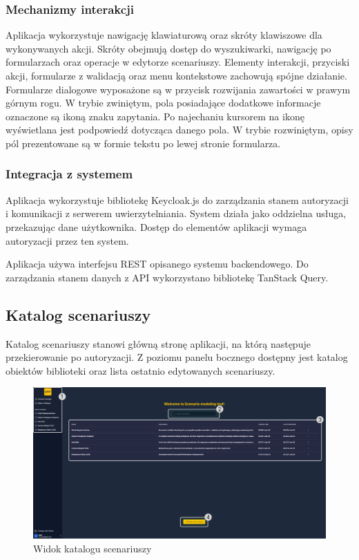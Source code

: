 \subsubsection{Mechanizmy interakcji}
Aplikacja wykorzystuje nawigację klawiaturową oraz skróty klawiszowe dla wykonywanych akcji. Skróty obejmują dostęp do wyszukiwarki, nawigację po formularzach oraz operacje w edytorze scenariuszy. Elementy interakcji, przyciski akcji, formularze z walidacją oraz menu kontekstowe zachowują spójne działanie.
Formularze dialogowe wyposażone są w przycisk rozwijania zawartości w prawym górnym rogu. W trybie zwiniętym, pola posiadające dodatkowe informacje oznaczone są ikoną znaku zapytania. Po najechaniu kursorem na ikonę wyświetlana jest podpowiedź dotycząca danego pola. W trybie rozwiniętym, opisy pól prezentowane są w formie tekstu po lewej stronie formularza.

\subsubsection{Integracja z systemem}
Aplikacja wykorzystuje bibliotekę Keycloak.js do zarządzania stanem autoryzacji i komunikacji z serwerem uwierzytelniania. System działa jako oddzielna usługa, przekazując dane użytkownika. Dostęp do elementów aplikacji wymaga autoryzacji przez ten system.


Aplikacja używa interfejsu REST opisanego systemu backendowego. Do zarządzania stanem danych z API wykorzystano bibliotekę TanStack Query.

\subsection{Katalog scenariuszy}

Katalog scenariuszy stanowi główną stronę aplikacji, na którą następuje przekierowanie po autoryzacji. Z poziomu panelu bocznego dostępny jest katalog obiektów biblioteki oraz lista ostatnio edytowanych scenariuszy.

\begin{figure}[h]
    \centering
    \includegraphics[width=\textwidth]{resources/local/04-implementacja/frontend/landing/landing-page-filled}
    \caption{Widok katalogu scenariuszy}
    \label{fig:scenario_manager}
\end{figure}


